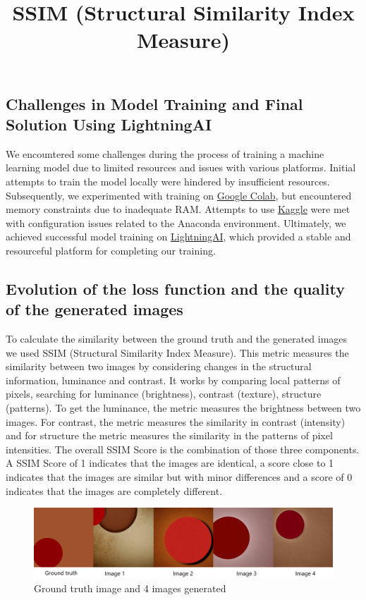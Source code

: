 \documentclass[12pt,a4paper]{report}
\begin{document}
\subsection*{Challenges in Model Training and Final Solution Using LightningAI}

We encountered some challenges during the process of training a machine learning model due to limited resources and issues with various platforms. Initial attempts to train the model locally were hindered by insufficient resources. Subsequently, we experimented with training on \href{https://colab.research.google.com/}{Google Colab}, but encountered memory constraints due to inadequate RAM. Attempts to use \href{https://www.kaggle.com/}{Kaggle} were met with configuration issues related to the Anaconda environment. Ultimately, we achieved successful model training on \href{https://lightning.ai/}{LightningAI}, which provided a stable and resourceful platform for completing our training.

\subsection*{Evolution of the loss function and the quality of the generated images}

\title{SSIM (Structural Similarity Index Measure)}

To calculate the similarity between the ground truth and the generated images we used SSIM (Structural Similarity Index Measure). This metric measures the similarity between two images by considering changes in the structural information, luminance and contrast. It works by comparing local patterns of pixels, searching for luminance (brightness), contrast (texture), structure (patterns). To get the luminance, the metric measures the brightness between two images. For contrast, the metric measures the similarity in contrast (intensity) and for structure the metric measures the similarity in the patterns of pixel intensities. The overall SSIM Score is the combination of those three components. A SSIM Score of 1 indicates that the images are identical, a score close to 1 indicates that the images are similar but with minor differences and a score of 0 indicates that the images are completely different.


\begin{figure}
    \centering
    \includegraphics[width=1\linewidth]{circle_images_ssid_metric.png}
    \caption{Ground truth image and 4 images generated}
    \label{fig:enter-label}
\end{figure}
\end{document}
